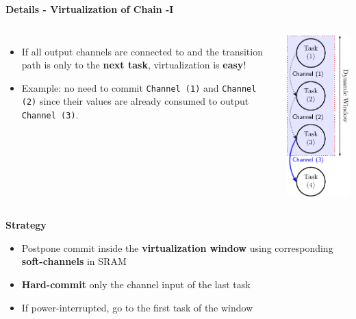 

\begin{frame}{\textbf{Details - Virtualization of Chain -I}}
	
	\begin{columns}		
		
		\begin{itemize}
			\item If all output channels are connected to and the transition path is only to the \textbf{next task}, virtualization is \textbf{easy}! 
			\item Example: no need to commit \texttt{Channel (1)} and \texttt{Channel (2)} since their values are already consumed to output \texttt{Channel (3)}.
		\end{itemize}
		
		\center
		\includegraphics[scale=0.50]{images/chain-virtualization.pdf}
	\end{columns}	
		
		\begin{block}{\textbf{Strategy}}
			\begin{itemize}
				\item Postpone commit inside the \textbf{virtualization window} using corresponding \textbf{soft-channels} in SRAM
				\item \textbf{Hard-commit} only the channel input of the last task 
				\item If power-interrupted, go to the first task of the window
			\end{itemize}	
		\end{block}
			
\end{frame}

